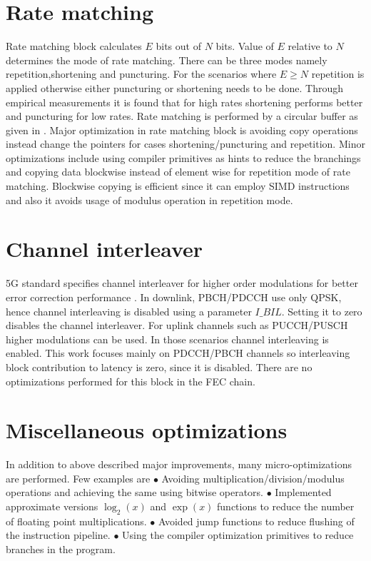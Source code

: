 \section{Rate matching}
Rate matching block calculates $E$ bits out of $N$ bits. Value of $E$ relative to $N$ determines the mode of rate matching. There can be three modes namely repetition,shortening and puncturing. For the scenarios where $E \geq N$ repetition is applied otherwise either puncturing or shortening needs to be done. Through empirical measurements it is found that for high rates shortening performs better and puncturing for low rates. Rate matching is performed by a circular buffer as given in \cite{DesignOfPolarCodes5G}. Major optimization in rate matching block is avoiding copy operations instead change the pointers for cases shortening/puncturing and repetition. Minor optimizations include using compiler primitives as hints to reduce the branchings and copying data blockwise instead of element wise for repetition mode of rate matching. Blockwise copying is efficient since it can employ SIMD instructions and also it avoids usage of modulus operation in repetition mode.

\section{Channel interleaver}
5G standard specifies channel interleaver for higher order modulations for better error correction performance \cite{3gpp.TSG-RAN_WG1}. In downlink, PBCH/PDCCH use only QPSK, hence channel interleaving is disabled using a parameter $I\_BIL$. Setting it to zero disables the channel interleaver. For uplink channels such as PUCCH/PUSCH higher modulations can be used. In those scenarios channel interleaving is enabled. This work focuses mainly on PDCCH/PBCH channels so interleaving block contribution to latency is zero, since it is disabled. There are no optimizations performed for this block in the FEC chain.

\section{Miscellaneous optimizations}
In addition to above described major improvements, many micro-optimizations are performed. Few examples are \newline
$\bullet $ Avoiding multiplication/division/modulus operations and achieving the same using bitwise operators.\newline
$\bullet $ Implemented approximate versions $\log_2{(x)}$ and $\exp{(x)}$ functions to reduce the number of floating point multiplications.\newline
$\bullet $ Avoided jump functions to reduce flushing of the instruction pipeline.\newline
$\bullet $ Using the compiler optimization primitives to reduce branches in the program.\newline


